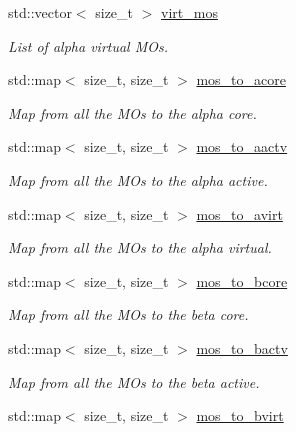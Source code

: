 \begin{DoxyCompactItemize}
std\+::vector$<$ size\+\_\+t $>$ \mbox{\hyperlink{classforte_1_1_s_o_m_r_d_s_r_g_a8e20b9eca3554dec9beef02b83358634}{virt\+\_\+mos}}
\begin{DoxyCompactList}\small\item\em List of alpha virtual M\+Os. \end{DoxyCompactList}\item 
std\+::map$<$ size\+\_\+t, size\+\_\+t $>$ \mbox{\hyperlink{classforte_1_1_s_o_m_r_d_s_r_g_ad855f2cba58a1045b313cfea998b61b3}{mos\+\_\+to\+\_\+acore}}
\begin{DoxyCompactList}\small\item\em Map from all the M\+Os to the alpha core. \end{DoxyCompactList}\item 
std\+::map$<$ size\+\_\+t, size\+\_\+t $>$ \mbox{\hyperlink{classforte_1_1_s_o_m_r_d_s_r_g_a06e69fffed3e426a3acb2418f5f524ef}{mos\+\_\+to\+\_\+aactv}}
\begin{DoxyCompactList}\small\item\em Map from all the M\+Os to the alpha active. \end{DoxyCompactList}\item 
std\+::map$<$ size\+\_\+t, size\+\_\+t $>$ \mbox{\hyperlink{classforte_1_1_s_o_m_r_d_s_r_g_ae33391dedd70c40ad0f0a2587871f9f4}{mos\+\_\+to\+\_\+avirt}}
\begin{DoxyCompactList}\small\item\em Map from all the M\+Os to the alpha virtual. \end{DoxyCompactList}\item 
std\+::map$<$ size\+\_\+t, size\+\_\+t $>$ \mbox{\hyperlink{classforte_1_1_s_o_m_r_d_s_r_g_a98f47cae8b7cb3c164e36cd1936065c6}{mos\+\_\+to\+\_\+bcore}}
\begin{DoxyCompactList}\small\item\em Map from all the M\+Os to the beta core. \end{DoxyCompactList}\item 
std\+::map$<$ size\+\_\+t, size\+\_\+t $>$ \mbox{\hyperlink{classforte_1_1_s_o_m_r_d_s_r_g_abffd61f975bf32e36845f136e42d6f99}{mos\+\_\+to\+\_\+bactv}}
\begin{DoxyCompactList}\small\item\em Map from all the M\+Os to the beta active. \end{DoxyCompactList}\item 
std\+::map$<$ size\+\_\+t, size\+\_\+t $>$ \mbox{\hyperlink{classforte_1_1_s_o_m_r_d_s_r_g_a3d8e7c5f35decdab9f18f229cc512184}{mos\+\_\+to\+\_\+bvirt}}

\end{DoxyCompactItemize}
